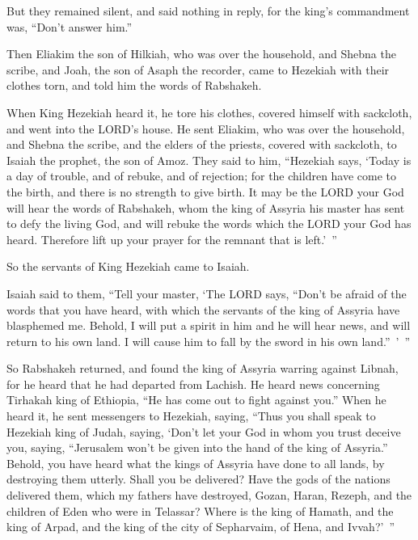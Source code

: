 \myverse{}But they remained silent, and said nothing in reply, for the
king’s commandment was, “Don’t answer him.”

\myverse{}Then Eliakim the son of Hilkiah, who was over the household,
and Shebna the scribe, and Joah, the son of Asaph the recorder, came to Hezekiah with their clothes torn,
and told him the words of Rabshakeh.


\mychapter{} \myverse*{}When King Hezekiah heard it, he tore his clothes, covered himself
with sackcloth, and went into the LORD’s house.
\myverse{}He sent Eliakim, who was over the household, and Shebna the scribe, and the
elders of the priests, covered with sackcloth, to Isaiah the prophet, the son of Amoz.
\myverse{}They said to him, “Hezekiah says, ‘Today is a day of trouble, and of rebuke,
and of rejection; for the children have come to the birth, and there is no strength to give birth.
\myverse{}It may be the LORD your God will hear the words of Rabshakeh, whom the king
of Assyria his master has sent to defy the living God, and will rebuke the words which the LORD your God
has heard. Therefore lift up your prayer for the remnant that is left.’ ”

\myverse{}So the servants of King Hezekiah came to Isaiah.

\myverse{}Isaiah said to them, “Tell your master, ‘The LORD says, “Don’t
be afraid of the words that you have heard, with which the servants of the king of Assyria have blasphemed
me.
\myverse{}Behold, I will put a spirit in him and he will hear news, and will return to
his own land. I will cause him to fall by the sword in his own land.” ’ ”

\myverse{}So Rabshakeh returned, and found the king of Assyria warring against
Libnah, for he heard that he had departed from Lachish.
\myverse{}He heard news concerning Tirhakah king of Ethiopia, “He has come out to fight
against you.” When he heard it, he sent messengers to Hezekiah, saying,
\myverse{}“Thus you shall speak to Hezekiah king of Judah, saying, ‘Don’t let your
God in whom you trust deceive you, saying, “Jerusalem won’t be given into the hand of the king of Assyria.”
\myverse{}Behold, you have heard what the kings of Assyria have done to all lands,
by destroying them utterly. Shall you be delivered?
\myverse{}Have the gods of the nations delivered them, which my fathers have destroyed,
Gozan, Haran, Rezeph, and the children of Eden who were in Telassar?
\myverse{}Where is the king of Hamath, and the king of Arpad, and the king of the city
of Sepharvaim, of Hena, and Ivvah?’ ”

